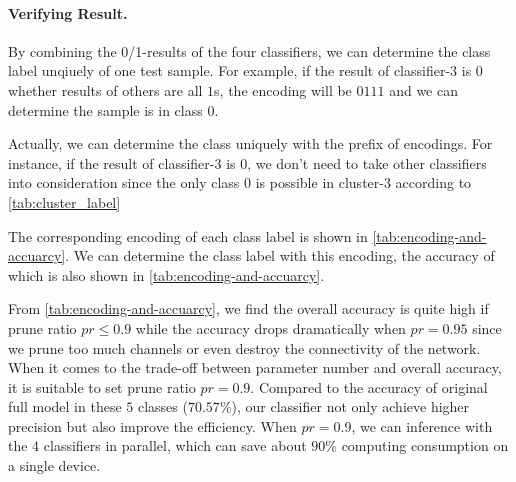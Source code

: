 \documentclass[sigplan,10pt,review]{acmart}\settopmatter{printfolios=true,printccs=false,printacmref=false}
\begin{document}
\paragraph{Verifying Result.}By combining the 0/1-results of the four classifiers, we can determine the class label unqiuely of one test sample.
For example, if the result of classifier-3 is $0$ whether results of others are all $1$s, the encoding will be $0111$ and we can determine the sample is in class $0$. 

Actually, we can determine the class uniquely with the prefix of encodings. 
For instance, if the result of classifier-3 is $0$, we don't need to take other classifiers into consideration since the only class $0$ is possible in cluster-3 according to \cref{tab:cluster_label}

The corresponding encoding of each class label is shown in \cref{tab:encoding-and-accuarcy}. 
We can determine the class label with this encoding, the accuracy of which is also shown in \cref{tab:encoding-and-accuarcy}. 


\begin{table}[h]

    \caption{Encoding and Accuracy of Each Class Label}
    \label{tab:encoding-and-accuarcy}
\end{table}

From \cref{tab:encoding-and-accuarcy}, we find the overall accuracy is quite high if prune ratio $pr\leq0.9$ while the accuracy drops dramatically when $pr=0.95$ since we prune too much channels or even destroy the connectivity of the network. 
When it comes to the trade-off between parameter number and overall accuracy, it is suitable to set prune ratio $pr=0.9$.
Compared to the accuracy of original full model in these $5$ classes ($70.57\%$), our classifier not only achieve higher precision but also improve the efficiency. When $pr=0.9$, we can inference with the $4$ classifiers in parallel, which can save about $90\%$ computing consumption on a single device.
\end{document}
